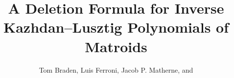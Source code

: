 \documentclass[final]{beamer}
\title{A Deletion Formula for Inverse Kazhdan--Lusztig Polynomials of Matroids} %
\author{Tom Braden, Luis Ferroni, Jacob P. Matherne, and \color{nred}{Nutan Nepal}} %
\institute{Department of Mathematics, North Carolina State University} %
\newlength{\sepwid}
\begin{document}

\setlength{\belowcaptionskip}{2ex} %
\setlength\belowdisplayshortskip{2ex} %

\begin{frame}[t] %

\begin{columns}[t] %


\begin{column}{\sepwid}\end{column} %


\end{columns}
\end{frame}
\end{document}
